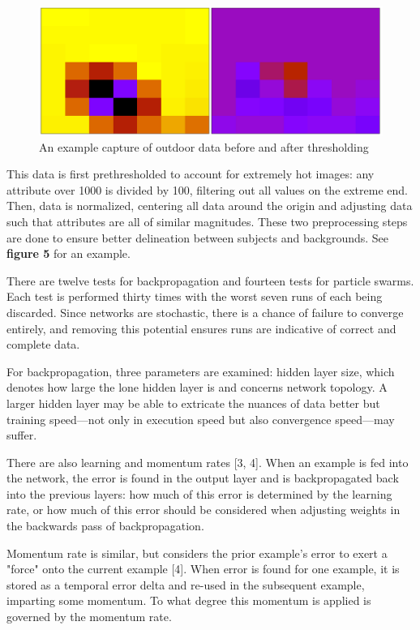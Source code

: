 \documentclass[a4paper,12pt]{article}
\begin{document}
\begin{figure}[h!]
\centering
\includegraphics[scale=0.35]{images/heat2.png}
\caption{An example capture of outdoor data before and after thresholding}
\label{fig:heat2}
\end{figure}

This data is first prethresholded to account for extremely hot images: any attribute over 1000 is divided by 100, filtering out all values on the extreme end. Then, data is normalized, centering all data around the origin and adjusting data such that attributes are all of similar magnitudes. These two preprocessing steps are done to ensure better delineation between subjects and backgrounds. See \textbf{figure 5} for an example.

There are twelve tests for backpropagation and fourteen tests for particle swarms. Each test is performed thirty times with the worst seven runs of each being discarded. Since networks are stochastic, there is a chance of failure to converge entirely, and removing this potential ensures runs are indicative of correct and complete data.

For backpropagation, three parameters are examined: hidden layer size, which denotes how large the lone hidden layer is and concerns network topology. A larger hidden layer may be able to extricate the nuances of data better but training speed---not only in execution speed but also convergence speed---may suffer.

There are also learning and momentum rates [3, 4]. When an example is fed into the network, the error is found in the output layer and is backpropagated back into the previous layers: how much of this error is determined by the learning rate, or how much of this error should be considered when adjusting weights in the backwards pass of backpropagation.

Momentum rate is similar, but considers the prior example's error to exert a "force" onto the current example [4]. When error is found for one example, it is stored as a temporal error delta and re-used in the subsequent example, imparting some momentum. To what degree this momentum is applied is governed by the momentum rate.
\end{document}

